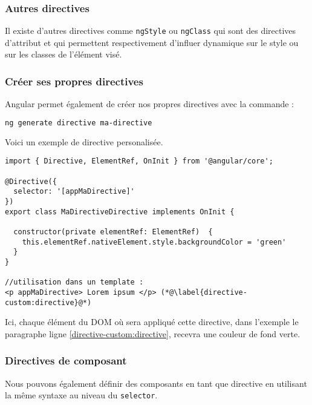 \subsubsection{Autres directives}
Il existe d'autres directives comme \texttt{ngStyle} ou \texttt{ngClass} qui sont des directives d'attribut et qui permettent respectivement d'influer dynamique sur le style ou sur les classes de l'élément visé.

\subsubsection{Créer ses propres directives}
Angular permet également de créer nos propres directives avec la commande :
\begin{lstlisting}[language=bash]
ng generate directive ma-directive
\end{lstlisting}

Voici un exemple de directive personalisée.
\begin{lstlisting}[style=htmlcssjs, caption={Directive personnalisée}, label=directive-custom]
import { Directive, ElementRef, OnInit } from '@angular/core';

@Directive({
  selector: '[appMaDirective]'
})
export class MaDirectiveDirective implements OnInit {

  constructor(private elementRef: ElementRef)  { 
  	this.elementRef.nativeElement.style.backgroundColor = 'green'
  }
}

//utilisation dans un template :
<p appMaDirective> Lorem ipsum </p> (*@\label{directive-custom:directive}@*)
\end{lstlisting}

Ici, chaque élément du DOM où sera appliqué cette directive, dans l'exemple le paragraphe ligne \ref{directive-custom:directive}, recevra une couleur de fond verte.

\subsubsection{Directives de composant}
Nous pouvons également définir des composants en tant que directive en utilisant la même syntaxe au niveau du \texttt{selector}.

